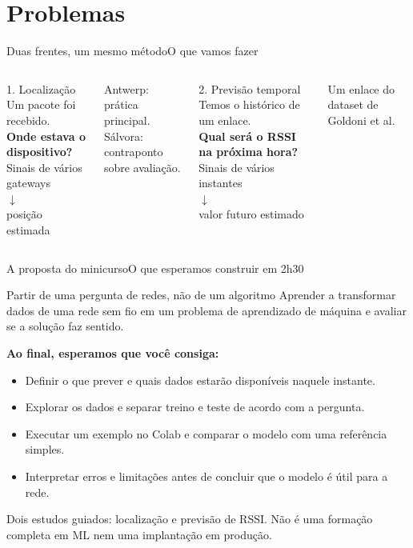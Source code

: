 \begin{frame}[plain]
\titlepage
\end{frame}

\section{Problemas}
\begin{frame}{Duas frentes, um mesmo método}{O que vamos fazer}
\begin{columns}[T]
\begin{block}{1. Localização}
Um pacote foi recebido.\\[2mm]
\textbf{Onde estava o dispositivo?}\\[2mm]
Sinais de vários gateways\\
$\downarrow$\\
posição estimada
\end{block}
Antwerp: prática principal.\\
Sálvora: contraponto sobre avaliação.
\begin{block}{2. Previsão temporal}
Temos o histórico de um enlace.\\[2mm]
\textbf{Qual será o RSSI na próxima hora?}\\[2mm]
Sinais de vários instantes\\
$\downarrow$\\
valor futuro estimado
\end{block}
Um enlace do dataset de Goldoni et al.
\end{columns}
\end{frame}

\begin{frame}{A proposta do minicurso}{O que esperamos construir em 2h30}
\begin{block}{Partir de uma pergunta de redes, não de um algoritmo}
Aprender a transformar dados de uma rede sem fio em um problema de aprendizado
de máquina e avaliar se a solução faz sentido.
\end{block}
\textbf{Ao final, esperamos que você consiga:}
\begin{itemize}
\item Definir o que prever e quais dados estarão disponíveis naquele instante.
\item Explorar os dados e separar treino e teste de acordo com a pergunta.
\item Executar um exemplo no Colab e comparar o modelo com uma referência simples.
\item Interpretar erros e limitações antes de concluir que o modelo é útil para a rede.
\end{itemize}
\vspace{2mm}
\small Dois estudos guiados: localização e previsão de RSSI.
Não é uma formação completa em ML nem uma implantação em produção.
\end{frame}

